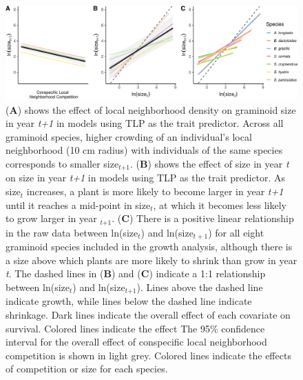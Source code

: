 \documentclass[12pt, letterpaper]{article}
\begin{document}
\begin{figure}
    \centering
    \includegraphics[width=1\textwidth]{figures/growthEffectPlots-1.pdf}
    \caption{(\textbf{A}) shows the effect of local neighborhood density on graminoid size in year \textit{t+1} in models using TLP as the trait predictor. Across all graminoid species, higher crowding of an individual's local neighborhood (10 cm radius) with individuals of the same species corresponds to smaller size$_\textit{t+1}$. (\textbf{B}) shows the effect of size in year \textit{t} on size in year \textit{t+1} in models using TLP as the trait predictor. As size$_\textit{t}$ increases, a plant is more likely to become larger in year \textit{t+1} until it reaches a mid-point in size$_\textit{t}$, at which it becomes less likely to grow larger in year $_\textit{t+1}$. (\textbf{C}) There is a positive linear relationship in the raw data between ln(size$_{t}$) and ln(size$_{t+1}$) for all eight graminoid species included in the growth analysis, although there is a size above which plants are more likely to shrink than grow in year \textit{t}. The dashed lines in (\textbf{B}) and (\textbf{C}) indicate a 1:1 relationship between ln(size$_\textit{t}$) and ln(size$_\textit{t+1}$). Lines above the dashed line indicate growth, while lines below the dashed line indicate shrinkage. Dark lines indicate the overall effect of each covariate on survival. Colored lines indicate the effect The 95\% confidence interval for the overall effect of conspecific local neighborhood competition is shown in light grey. Colored lines indicate the effects of competition or size for each species.
    }
    \label{fig:Effects_Growth}
\end{figure}
\end{document}

